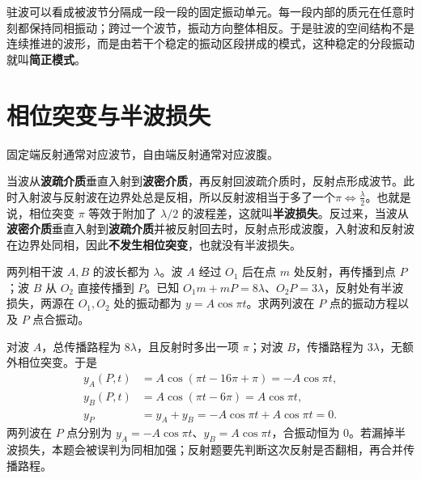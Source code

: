 \documentclass[lang=cn,11pt]{elegantbook}
\begin{document}
\begin{definition}[简正模式]
驻波可以看成被波节分隔成一段一段的固定振动单元。每一段内部的质元在任意时刻都保持同相振动；跨过一个波节，振动方向整体相反。于是驻波的空间结构不是连续推进的波形，而是由若干个稳定的振动区段拼成的模式，这种稳定的分段振动就叫\textbf{简正模式}。
\end{definition}

\section{相位突变与半波损失}
\begin{note}
固定端反射通常对应波节，自由端反射通常对应波腹。
\end{note}
\begin{definition}
当波从\textbf{波疏介质}垂直入射到\textbf{波密介质}，再反射回波疏介质时，反射点形成波节。此时入射波与反射波在边界处总是反相，所以反射波相当于多了一个\(\pi \iff \frac{\lambda}{2}\)。也就是说，相位突变 \(\pi\) 等效于附加了 \(\lambda/2\) 的波程差，这就叫\textbf{半波损失}。反过来，当波从\textbf{波密介质}垂直入射到\textbf{波疏介质}并被反射回去时，反射点形成波腹，入射波和反射波在边界处同相，因此\textbf{不发生相位突变}，也就没有半波损失。
\end{definition}

\begin{exercise}[反射后再与另一列波相遇时怎样先记半波损失]
两列相干波 \(A,B\) 的波长都为 \(\lambda\)。波 \(A\) 经过 \(O_1\) 后在点 \(m\) 处反射，再传播到点 \(P\)；波 \(B\) 从 \(O_2\) 直接传播到 \(P\)。已知 \(O_1m+mP=8\lambda\)、\(O_2P=3\lambda\)，反射处有半波损失，两源在 \(O_1,O_2\) 处的振动都为 \(y=A\cos \pi t\)。求两列波在 \(P\) 点的振动方程以及 \(P\) 点合振动。
\end{exercise}
\begin{solution}
对波 \(A\)，总传播路程为 \(8\lambda\)，且反射时多出一项 \(\pi\)；对波 \(B\)，传播路程为 \(3\lambda\)，无额外相位突变。于是
\[
\begin{aligned}
y_A(P,t)&=A\cos(\pi t-16\pi+\pi)=-A\cos\pi t,\\
y_B(P,t)&=A\cos(\pi t-6\pi)=A\cos\pi t,\\
y_P&=y_A+y_B=-A\cos\pi t+A\cos\pi t=0.
\end{aligned}
\]
两列波在 \(P\) 点分别为 \(y_A=-A\cos\pi t\)、\(y_B=A\cos\pi t\)，合振动恒为 \(0\)。若漏掉半波损失，本题会被误判为同相加强；反射题要先判断这次反射是否翻相，再合并传播路程。
\end{solution}
\end{document}
